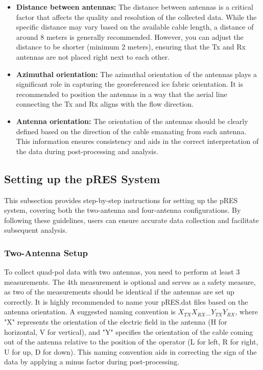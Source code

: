 \documentclass[a4paper,12pt]{article}
\begin{document}
\begin{itemize}
\item \textbf{Distance between antennas:} The distance between antennas is a critical factor that
affects the quality and resolution of the collected data. While the specific distance may vary based
on the available cable length, a distance of around 8 meters is generally recommended. However, you
can adjust the distance to be shorter (minimum 2 meters), ensuring that the Tx and Rx antennas are
not placed right next to each other.

\item \textbf{Azimuthal orientation:} The azimuthal orientation of the antennas plays a significant
role in capturing the georeferenced ice fabric orientation. It is recommended to position the
antennas in a way that the aerial line connecting the Tx and Rx aligns with the flow direction.

\item \textbf{Antenna orientation:} The orientation of the antennas should be clearly defined based
on the direction of the cable emanating from each antenna. This information ensures consistency and
aids in the correct interpretation of the data during post-processing and analysis.

\end{itemize}

\subsection{Setting up the pRES System}
This subsection provides step-by-step instructions for setting up the pRES system, covering both the
two-antenna and four-antenna configurations. By following these guidelines, users can ensure
accurate data collection and facilitate subsequent analysis.

\subsubsection{Two-Antenna Setup}
To collect quad-pol data with two antennas, you need to perform at least 3 measurements. The 4th
measurement is optional and serves as a safety measure, as two of the measurements should be
identical if the antennas are set up correctly. It is highly recommended to name your pRES.dat files
based on the antenna orientation. A suggested naming convention is $X_{TX}X_{RX}$\_$Y_{TX}Y_{RX}$,
where "X" represents the orientation of the electric field in the antenna (H for horizontal, V for
vertical), and "Y" specifies the orientation of the cable coming out of the antenna relative to the
position of the operator (L for left, R for right, U for up, D for down). This naming convention
aids in correcting the sign of the data by applying a minus factor during post-processing.
\end{document}
